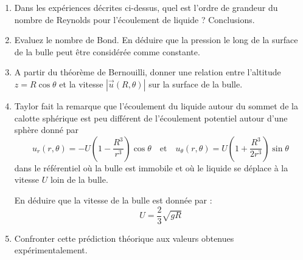 \begin{enumerate}

\item 
Dans les exp\'eriences d\'ecrites ci-dessus, quel est l'ordre de grandeur du nombre de Reynolds 
pour l'\'ecoulement de liquide ?
Conclusions.

\item Evaluez le nombre de Bond. En déduire que la pression le long de la surface de la bulle peut être considérée comme constante.


\item A partir du théorème de Bernouilli, donner une relation entre l'altitude 
$z= R \cos \theta$  et la vitesse $|\vec{u}(R,\theta)|$ sur la surface de la bulle.



\item 
Taylor fait la remarque que l'\'ecoulement du liquide autour du sommet
de la calotte sph\'erique est peu diff\'erent de l'\'ecoulement potentiel
autour d'une sph\`ere donn\'e par
$$
u_r(r, \theta) = -U\left ( 1 - \frac{R^3}{r^3} \right ) \cos\theta
\quad \mbox{et} \quad
u_\theta(r, \theta) = U\left ( 1 + \frac{R^3}{2r^3} \right ) \sin \theta
$$
dans le r\'ef\'erentiel o\`u la bulle est immobile et o\`u le liquide
se d\'eplace \`a la vitesse $U$ loin de la bulle. 

%


En déduire que la vitesse de la bulle est donnée par :
$$
U = \frac{2}{3} \sqrt{gR}
$$

\item
Confronter cette pr\'ediction th\'eorique aux valeurs obtenues exp\'erimentalement.

\end{enumerate}

















